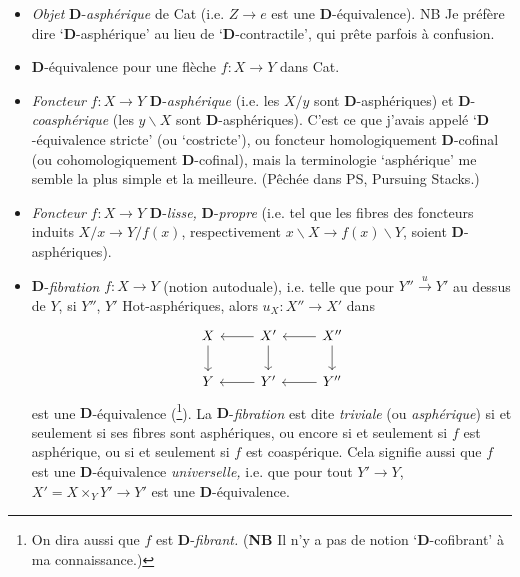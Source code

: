 \documentclass[11pt]{article}
\newcommand{\msp}[1]{\marginpar{\footnotesize [#1]}}
\newcommand{\D}{\mathbf{D}}
\begin{document}
\begin{itemize}
\item[(i)] \textit{Objet} $\D$-\textit{asphérique} de Cat (i.e. $Z \longrightarrow e$ est une $\D$-équivalence). NB Je préfère dire ‘$\D$-asphérique’ au lieu de ‘$\D$-contractile’, qui prête parfois à confusion.

\item[\textcircled{ii}] $\D$-équivalence pour une flèche $f : X \longrightarrow Y$ dans Cat.

\item[(iii)] \textit{Foncteur} $f : X \longrightarrow Y$ $\D$-\textit{asphérique} (i.e. les $X/y$ sont $\D$-asphériques) et $\D$-\textit{coasphérique} (les $y\backslash X$ sont $\D$-asphériques). C’est ce que j’avais appelé ‘$\D$-équivalence stricte’ (ou ‘costricte’), ou foncteur homologiquement $\D$-cofinal (ou cohomologiquement $\D$-cofinal), mais la terminologie ‘asphérique’ me semble la plus simple et la meilleure. (Pêchée dans PS, Pursuing Stacks.)

\item[(iv)] \textit{Foncteur} $f : X \longrightarrow Y$ $\D$-\textit{lisse,} $\D$-\textit{propre} (i.e. tel que les fibres des foncteurs induits $X/x \longrightarrow Y/f(x)$, respectivement $x\backslash X \longrightarrow f(x)\backslash Y$, soient $\D$-asphériques).

\item[(v)] $\D$-\textit{fibration} $f : X \longrightarrow Y$ (notion autoduale), i.e. telle que pour $Y'' \xrightarrow{u} Y'$ au dessus de $Y$, si $Y''$, $Y'$ Hot-asphériques, alors $u_X : X'' \longrightarrow X'$ dans
\[
\begin{tikzcd}
X \arrow[d] & X' \arrow[l] \arrow[d] & X'' \arrow[l] \arrow[d] \\
Y & Y' \arrow[l] & Y'' \arrow[l]
\end{tikzcd}
\]
est une $\D$-équivalence (\footnote{On dira aussi que $f$ est $\D$-\textit{fibrant.} (\textbf{NB} Il n’y a pas de notion ‘$\D$-cofibrant’ à ma connaissance.)}). La $\D$-\textit{fibration} est dite \textit{triviale} (ou \textit{asphérique}) si et seulement si ses fibres sont asphériques, ou encore si et seulement si $f$ est asphérique, ou si et seulement si $f$ est coaspérique. Cela signifie aussi que $f$ est une $\D$-équivalence \textit{universelle,} %
\msp{page 2}
i.e. que pour tout $Y' \longrightarrow Y$, $X' = X \times_Y Y' \longrightarrow Y'$ est une $\D$-équivalence.


\end{itemize}
\end{document}
